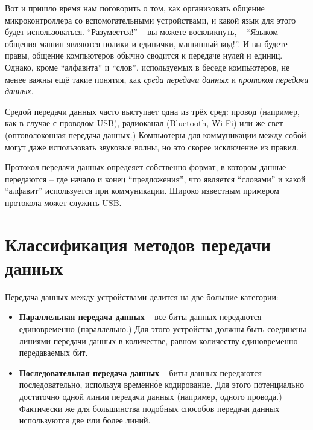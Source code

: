 \documentclass[../sparc.tex]{subfiles}
\begin{document}

Вот и пришло время нам поговорить о том, как организовать общение
микроконтроллера со вспомогательными устройствами, и какой язык для этого будет
использоваться.  ``Разумеется!'' -- вы можете воскликнуть, -- ``Языком общения
машин являются нолики и единички, машинный код!''.  И вы будете правы, общение
компьютеров обычно сводится к передаче нулей и единиц.  Однако, кроме
``алфавита'' и ``слов'', используемых в беседе компьютеров, не менее важны ещё
такие понятия, как \emph{среда передачи данных} и \emph{протокол передачи
данных}.

Средой передачи данных часто выступает одна из трёх сред: провод (например, как
в случае с проводом USB), радиоканал (Bluetooth, Wi-Fi) или же свет
(оптоволоконная передача данных.)  Компьютеры для коммуникации между собой могут
даже использовать звуковые волны, но это скорее исключение из правил.

Протокол передачи данных опредеяет собственно формат, в котором данные
передаются -- где начало и конец ``предложения'', что является ``словами'' и
какой ``алфавит'' используется при коммуникации.  Широко известным примером
протокола может служить USB.

\section{Классификация методов передачи данных}


Передача данных между устройствами делится на две большие категории:

\begin{itemize}
\item \textbf{Параллельная передача данных} -- все биты данных передаются
  единовременно (параллельно.)  Для этого устройства должны быть соединены
  линиями передачи данных в количестве, равном количеству единовременно
  передаваемых бит.
\item \textbf{Последовательная передача данных} -- биты данных передаются
  последовательно, используя временн\'{о}е кодирование.  Для этого потенциально
  достаточно одной линии передачи данных (например, одного провода.) Фактически
  же для большинства подобных способов передачи данных используются две или
  более линий.
\end{itemize}
\end{document}
